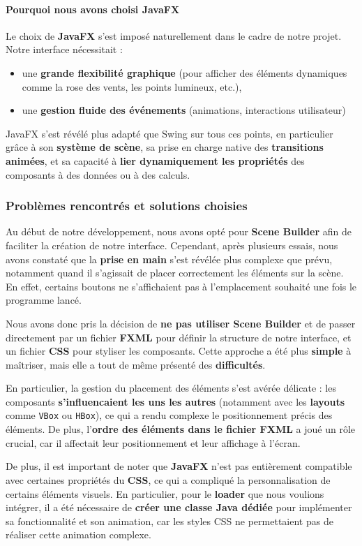 \paragraph{\textbf{Pourquoi nous avons choisi JavaFX}}

Le choix de \textbf{JavaFX} s’est imposé naturellement dans le cadre de notre projet. Notre interface nécessitait :

\begin{itemize}
    \item une \textbf{grande flexibilité graphique} (pour afficher des éléments dynamiques comme la rose des vents, les points lumineux, etc.),
    \item une \textbf{gestion fluide des événements} (animations, interactions utilisateur)


\end{itemize}
JavaFX s’est révélé plus adapté que Swing sur tous ces points, en particulier grâce à son \textbf{système de scène}, sa prise en charge native des \textbf{transitions animées}, et sa capacité à \textbf{lier dynamiquement les propriétés} des composants à des données ou à des calculs.



\subsubsection{Problèmes rencontrés et solutions choisies}

Au début de notre développement, nous avons opté pour \textbf{Scene Builder} afin de faciliter la création de notre interface. Cependant, après plusieurs essais, nous avons constaté que la \textbf{prise en main} s'est révélée plus complexe que prévu, notamment quand il s’agissait de placer correctement les éléments sur la scène. En effet, certains boutons ne s’affichaient pas à l’emplacement souhaité une fois le programme lancé.
 
Nous avons donc pris la décision de \textbf{ne pas utiliser Scene Builder} et de passer directement par un fichier \textbf{FXML} pour définir la structure de notre interface, et un fichier \textbf{CSS} pour styliser les composants. Cette approche a été plus \textbf{simple} à maîtriser, mais elle a tout de même présenté des \textbf{difficultés}.
 
En particulier, la gestion du placement des éléments s'est avérée délicate : les composants \textbf{s'influencaient les uns les autres} (notamment avec les \textbf{layouts} comme \verb|VBox| ou \verb|HBox|), ce qui a rendu complexe le positionnement précis des éléments. De plus, l’\textbf{ordre des éléments dans le fichier FXML} a joué un rôle crucial, car il affectait leur positionnement et leur affichage à l'écran.

De plus, il est important de noter que \textbf{JavaFX} n’est pas entièrement compatible avec certaines propriétés du \textbf{CSS}, ce qui a compliqué la personnalisation de certains éléments visuels. En particulier, pour le \textbf{loader} que nous voulions intégrer, il a été nécessaire de \textbf{créer une classe Java dédiée} pour implémenter sa fonctionnalité et son animation, car les styles CSS ne permettaient pas de réaliser cette animation complexe.

